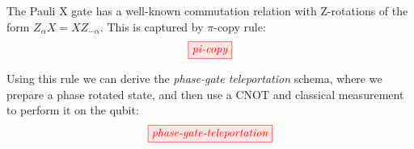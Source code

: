 \documentclass[a4paper, 12pt]{article}
\begin{document}
The Pauli X gate has a well-known commutation relation with Z-rotations of the form $Z_\alpha X = XZ_{-\alpha}$. This is captured by $\pi$-copy rule:
\begin{equation*}
        \tikzfig{pi-copy}
\end{equation*}

Using this rule we can derive the \emph{phase-gate teleportation} schema, where we prepare a phase rotated state, and then use a CNOT and classical measurement to perform it on the qubit:
\begin{equation*}
    \tikzfig{phase-gate-teleportation}
\end{equation*}
\end{document}
